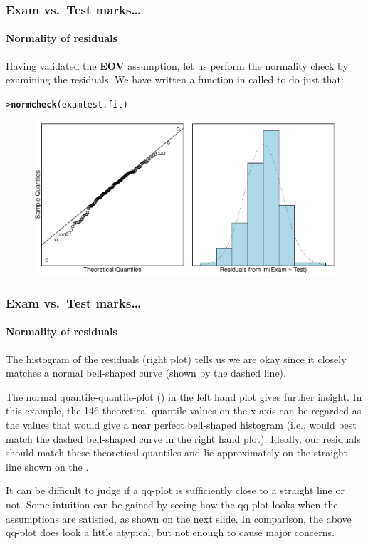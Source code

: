 \documentclass{beamer}\usepackage[]{graphicx}\usepackage[]{xcolor}
\makeatletter
\newcommand{\hlstd}[1]{\textcolor[rgb]{0.345,0.345,0.345}{#1}}%
\newcommand{\hlkwd}[1]{\textcolor[rgb]{0.737,0.353,0.396}{\textbf{#1}}}%
\newenvironment{kframe}{%
 \def\at@end@of@kframe{}%
 \ifinner\ifhmode%
  \def\at@end@of@kframe{\end{minipage}}%
  \begin{minipage}{\columnwidth}%
 \fi\fi%
 \def\FrameCommand##1{\hskip\@totalleftmargin \hskip-\fboxsep
 \colorbox{shadecolor}{##1}\hskip-\fboxsep
     \hskip-\linewidth \hskip-\@totalleftmargin \hskip\columnwidth}%
 \MakeFramed {\advance\hsize-\width
   \@totalleftmargin\z@ \linewidth\hsize
   \@setminipage}}%
 {\par\unskip\endMakeFramed%
 \at@end@of@kframe}
\newenvironment{knitrout}{}{} %
\makeatother
\begin{document}
\begin{frame}[fragile]
\frametitle{Exam vs.\ Test marks\ldots}
\framesubtitle{Normality of residuals}

Having validated the \textbf{EOV} assumption, let us perform the normality check 
by examining the residuals.  
We have written a function in  called  to do just that:

\begin{knitrout}\scriptsize
{}\color{fgcolor}\begin{kframe}
\begin{alltt}
\hlstd{> }\hlkwd{normcheck}\hlstd{(examtest.fit)}
\end{alltt}
\end{kframe}
\end{knitrout}



\begin{figure}
  \centering
  \includegraphics[scale=0.5]{figure/RC-H02-015}
\end{figure}
 
\end{frame}


\begin{frame}[fragile]
\frametitle{Exam vs.\ Test marks\ldots}
\framesubtitle{Normality of residuals}
The histogram of the residuals (right plot) tells us we are okay since it closely matches
a normal bell-shaped curve (shown by the dashed line).
\medskip

The normal quantile-quantile-plot () in the left hand plot gives further insight.  In this example, the 146 theoretical quantile values on the x-axis can be regarded as the values that would give a near perfect bell-shaped histogram (i.e., would best match the dashed bell-shaped curve in the right hand plot). Ideally, our residuals should match these theoretical quantiles and lie approximately on the straight line shown on the .
\medskip

It can be difficult to judge if a qq-plot is sufficiently close to a straight line or not. Some intuition can be gained by seeing how the qq-plot looks when the assumptions are satisfied, as shown on the next slide. In comparison, the above qq-plot does look a little atypical, but not enough to cause major concerns.
\end{frame}
\end{document}
